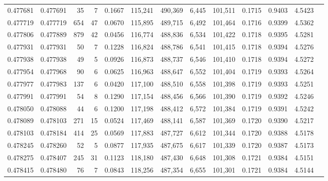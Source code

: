 \begin{tabular}{rrrrrrrrrrrrr}
0.477681 & 0.477691 &    35 &     7 &                                     0.1667 & 115,241 & 490,369 &   6,445 & 101,511 & 0.1715 & 0.9403 & 4.5423 \\
0.477719 & 0.477719 &   654 &    47 &                                     0.0670 & 115,895 & 489,715 &   6,492 & 101,464 & 0.1716 & 0.9399 & 4.5362 \\
0.477806 & 0.477889 &   879 &    42 &                                     0.0456 & 116,774 & 488,836 &   6,534 & 101,422 & 0.1718 & 0.9395 & 4.5281 \\
0.477931 & 0.477931 &    50 &     7 &                                     0.1228 & 116,824 & 488,786 &   6,541 & 101,415 & 0.1718 & 0.9394 & 4.5276 \\
0.477938 & 0.477938 &    49 &     5 &                                     0.0926 & 116,873 & 488,737 &   6,546 & 101,410 & 0.1718 & 0.9394 & 4.5272 \\
0.477954 & 0.477968 &    90 &     6 &                                     0.0625 & 116,963 & 488,647 &   6,552 & 101,404 & 0.1719 & 0.9393 & 4.5264 \\
0.477977 & 0.477983 &   137 &     6 &                                     0.0420 & 117,100 & 488,510 &   6,558 & 101,398 & 0.1719 & 0.9393 & 4.5251 \\
0.477991 & 0.477991 &    54 &     8 &                                     0.1290 & 117,154 & 488,456 &   6,566 & 101,390 & 0.1719 & 0.9392 & 4.5246 \\
0.478050 & 0.478088 &    44 &     6 &                                     0.1200 & 117,198 & 488,412 &   6,572 & 101,384 & 0.1719 & 0.9391 & 4.5242 \\
0.478089 & 0.478103 &   271 &    15 &                                     0.0524 & 117,469 & 488,141 &   6,587 & 101,369 & 0.1720 & 0.9390 & 4.5217 \\
0.478103 & 0.478184 &   414 &    25 &                                     0.0569 & 117,883 & 487,727 &   6,612 & 101,344 & 0.1720 & 0.9388 & 4.5178 \\
0.478245 & 0.478260 &    52 &     5 &                                     0.0877 & 117,935 & 487,675 &   6,617 & 101,339 & 0.1720 & 0.9387 & 4.5173 \\
0.478275 & 0.478407 &   245 &    31 &                                     0.1123 & 118,180 & 487,430 &   6,648 & 101,308 & 0.1721 & 0.9384 & 4.5151 \\
0.478415 & 0.478480 &    76 &     7 &                                     0.0843 & 118,256 & 487,354 &   6,655 & 101,301 & 0.1721 & 0.9384 & 4.5144 \\

\end{tabular}
